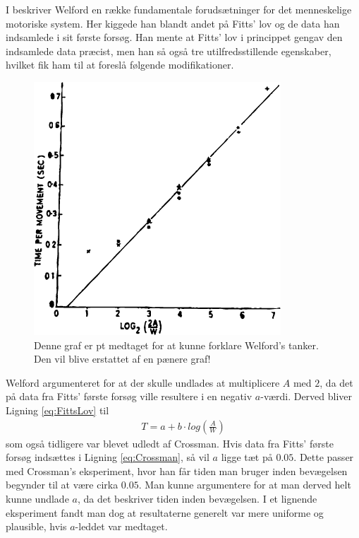 I \cite{welford1968} beskriver Welford en række fundamentale forudsætninger for det menneskelige motoriske system. Her kiggede han blandt andet på Fitts' lov og de data han indsamlede i sit første forsøg. Han mente at Fitts' lov i princippet gengav den indsamlede data præcist, men han så også tre utilfredsstillende egenskaber, hvilket fik ham til at foreslå følgende modifikationer.
\begin{figure}[h]
\centering
\includegraphics{billeder/WelfordGraf.png}
\caption{Denne graf er pt medtaget for at kunne forklare Welford's tanker. Den vil blive erstattet af en pænere graf!}
\label{fig:WelfordGraf}
\end{figure}
Welford argumenteret for at der skulle undlades at multiplicere $A$ med $2$, da det på data fra Fitts' første forsøg ville resultere i en negativ $a$-værdi. Derved bliver Ligning \ref{eq:FittsLov} til
\begin{align}
\label{eq:Crossman}
T = a + b \cdot log\left(\frac{A}{W}\right)
\end{align}
som også tidligere var blevet udledt af Crossman\cite{crossman1957}. Hvis data fra Fitts' første forsøg indsættes i Ligning \ref{eq:Crossman}, så vil $a$ ligge tæt på $0.05$. Dette passer med Crossman's eksperiment, hvor han får tiden man bruger inden bevægelsen begynder til at være cirka $0.05$\cite{crossman1957}. Man kunne argumentere for at man derved helt kunne undlade $a$, da det beskriver tiden inden bevægelsen. I et lignende eksperiment\cite{welford1958} fandt man dog at resultaterne generelt var mere uniforme og plausible, hvis $a$-leddet var medtaget.

